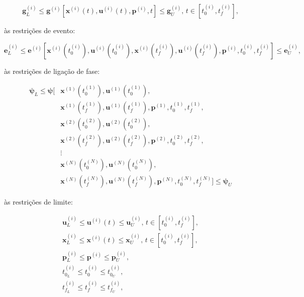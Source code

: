 \begin{equation}
\label{eq:restrições-trajetória}
    \mathbf{g}_L^{(i)} \leq \mathbf{g}^{(i)} \left[ \mathbf{x}^{(i)}(t), \mathbf{u}^{(i)}(t), \mathbf{p}^{(i)}, t \right] \leq \mathbf{g}_U^{(i)}, \, t \in \left[ t_0^{(i)}, t_f^{(i)} \right],
\end{equation}

\noindent às restrições de evento:

\begin{equation}
\label{eq:restrições-evento}
     \mathbf{e}_L^{(i)} \leq \mathbf{e}^{(i)} \left[ 
     \mathbf{x}^{(i)} \left( t_0^{(i)} \right),
     \mathbf{u}^{(i)} \left( t_0^{(i)} \right),
     \mathbf{x}^{(i)} \left( t_f^{(i)} \right),
     \mathbf{u}^{(i)} \left( t_f^{(i)} \right),
     \mathbf{p}^{(i)}, 
     t_0^{(i)},
     t_f^{(i)} \right] \leq \mathbf{e}_U^{(i)},
\end{equation}

\noindent às restrições de ligação de fase:

\begin{equation}
\label{eq:restrições-fase}
\begin{aligned}
    \boldsymbol{\psi}_L \leq \boldsymbol{\psi} [ & \mathbf{x}^{(1)} \left( t_0^{(1)} \right), \mathbf{u}^{(1)} \left( t_0^{(1)} \right), \\
        & \mathbf{x}^{(1)} \left( t_f^{(1)} \right), \mathbf{u}^{(1)} \left( t_f^{(1)} \right), \mathbf{p}^{(1)}, t_0^{(1)}, t_f^{(1)}, \\
        & \mathbf{x}^{(2)} \left( t_0^{(2)} \right), \mathbf{u}^{(2)} \left( t_0^{(2)} \right), \\
        & \mathbf{x}^{(2)} \left( t_f^{(2)} \right), \mathbf{u}^{(2)} \left( t_f^{(2)} \right), \mathbf{p}^{(2)}, t_0^{(2)}, t_f^{(2)}, \\
        & \vdots \\
        & \mathbf{x}^{(N)} \left( t_0^{(N)} \right), \mathbf{u}^{(N)} \left( t_0^{(N)} \right), \\
        & \mathbf{x}^{(N)} \left( t_f^{(N)} \right), \mathbf{u}^{(N)} \left( t_f^{(N)} \right), \mathbf{p}^{(N)}, t_0^{(N)}, t_f^{(N)} ] \leq \boldsymbol{\psi}_U
\end{aligned}
\end{equation}

\noindent às restrições de limite:

\begin{gather}
    \mathbf{u}_L^{(i)} \leq \mathbf{u}^{(i)}(t) \leq \mathbf{u}_U^{(i)}, \, t \in \left[ t_0^{(i)}, t_f^{(i)} \right], \nonumber \\
    \mathbf{x}_L^{(i)} \leq \mathbf{x}^{(i)}(t) \leq \mathbf{x}_U^{(i)}, \, t \in \left[ t_0^{(i)}, t_f^{(i)} \right], \nonumber \\
    \mathbf{p}_L^{(i)} \leq \mathbf{p}^{(i)} \leq \mathbf{p}_U^{(i)}, \\
    t_{0_L}^{(i)} \leq t_0^{(i)} \leq t_{0_U}^{(i)}, \nonumber \\
    t_{f_L}^{(i)} \leq t_f^{(i)} \leq t_{f_U}^{(i)}, \nonumber
\end{gather}

